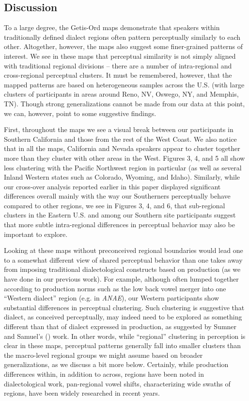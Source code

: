 \documentclass[output=paper]{LSP/langsci}
\begin{document}
\subsection{Discussion}
To a large degree, the Getis-Ord maps demonstrate that speakers within traditionally defined dialect regions often pattern perceptually similarly to each other. Altogether, however, the maps also suggest some finer-grained patterns of interest. We see in these maps that perceptual similarity is not simply aligned with traditional regional divisions – there are a number of intra-regional and cross-regional perceptual clusters. It must be remembered, however, that the mapped patterns are based on heterogeneous samples across the U.S. (with large clusters of participants in areas around Reno, NV, Oswego, NY, and Memphis, TN). Though strong generalizations cannot be made from our data at this point, we can, however, point to some suggestive findings.

First, throughout the maps we see a visual break between our participants in Southern California and those from the rest of the West Coast. We also notice that in all the maps, California and Nevada speakers appear to cluster together more than they cluster with other areas in the West. Figures 3, 4, and 5 all show less clustering with the Pacific Northwest region in particular (as well as several Inland Western states such as Colorado, Wyoming, and Idaho). Similarly, while our cross-over analysis reported earlier in this paper displayed significant differences overall mainly with the way our Southerners perceptually behave compared to other regions, we see in Figures 3, 4, and 6, that sub-regional clusters in the Eastern U.S. and among our Southern site participants suggest that more subtle intra-regional differences in perceptual behavior may also be important to explore.  

Looking at these maps without preconceived regional boundaries would lead one to a somewhat different view of shared perceptual behavior than one takes away from imposing traditional dialectological constructs based on production (as we have done in our previous work). For example, although often lumped together according to production norms such as the low back vowel merger into one “Western dialect” region (e.g. in \textit{ANAE}), our Western participants show substantial differences in perceptual clustering. Such clustering is suggestive that dialect, as conceived perceptually, may indeed need to be explored as something different than that of dialect expressed in production, as suggested by Sumner and Samuel’s (\citeyear{sumner_effect_2009}) work. In other words, while “regional” clustering in perception is clear in these maps, perceptual patterns generally fall into smaller clusters than the macro-level regional groups we might assume based on broader generalizations, as we discuss a bit more below. Certainly, while production differences within, in addition to across, regions have been noted in dialectological work, pan-regional vowel shifts, characterizing wide swaths of regions, have been widely researched in recent years.  
\end{document}
